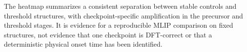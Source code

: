 The heatmap summarizes a consistent separation between stable controls and threshold structures, with checkpoint-specific amplification in the precursor and threshold stages. It is evidence for a reproducible MLIP comparison on fixed structures, not evidence that one checkpoint is DFT-correct or that a deterministic physical onset time has been identified.
